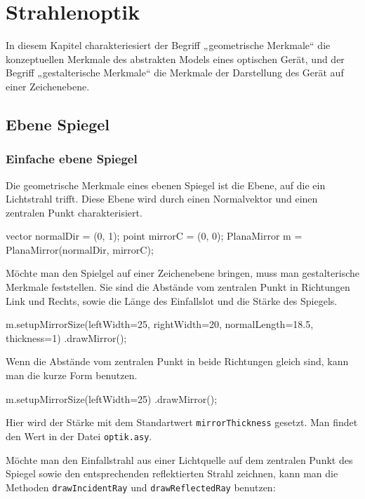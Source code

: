 \chapter{Strahlenoptik}

In diesem Kapitel charakteriesiert der Begriff „geometrische Merkmale“ die konzeptuellen Merkmale des abstrakten Models eines optischen Gerät,
und der Begriff „gestalterische Merkmale“ die Merkmale der Darstellung des Gerät auf einer Zeichenebene.

\section{Ebene Spiegel}

\subsection{Einfache ebene Spiegel}

Die geometrische Merkmale eines ebenen Spiegel ist die Ebene, auf die ein Lichtstrahl trifft.
Diese Ebene wird durch einen Normalvektor und einen zentralen Punkt charakterisiert.

\begin{asycode}
vector normalDir = (0, 1);
point mirrorC = (0, 0);
PlanaMirror m = PlanaMirror(normalDir, mirrorC);
\end{asycode}

Möchte man den Spielgel auf einer Zeichenebene bringen, muss man gestalterische Merkmale feststellen.
Sie sind die Abstände vom zentralen Punkt in Richtungen Link und Rechts, sowie die Länge des Einfallslot und die Stärke des Spiegels.

\begin{asycode}
m.setupMirrorSize(leftWidth=25, rightWidth=20, normalLength=18.5, thickness=1)
 .drawMirror();
\end{asycode}

Wenn die Abstände vom zentralen Punkt in beide Richtungen gleich sind, kann man die kurze Form benutzen.

\begin{asycode}
m.setupMirrorSize(leftWidth=25)
 .drawMirror();
\end{asycode}

Hier wird der Stärke mit dem Standartwert \texttt{mirrorThickness} gesetzt.
Man findet den Wert in der Datei \texttt{optik.asy}.

Möchte man den Einfallstrahl aus einer Lichtquelle auf dem zentralen Punkt des Spiegel sowie den entsprechenden reflektierten Strahl zeichnen,
kann man die Methoden \texttt{drawIncidentRay} und \texttt{drawReflectedRay} benutzen:

